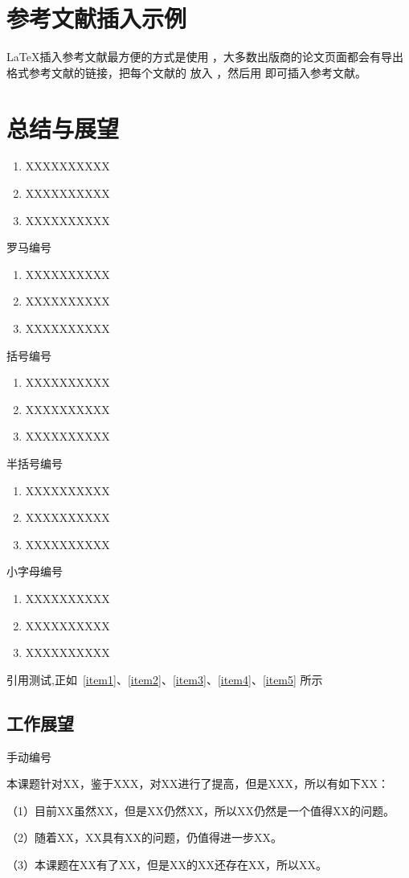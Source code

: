 
\section{参考文献插入示例}

\LaTeX \cite{lamport1994latex}插入参考文献最方便的方式是使用 \cite{pritchard1969statistical}，大多数出版商的论文页面都会有导出  格式参考文献的链接，把每个文献的  放入 ，然后用  即可插入参考文献。

\lipsum



\section{总结与展望}

\begin{enumerate}
 \item XXXXXXXXXX
 \label{item1}
 \item XXXXXXXXXX
 \item XXXXXXXXXX
\end{enumerate}
罗马编号
\begin{enumerate}[label=(\roman*)]
 \item XXXXXXXXXX
 \label{item2}
 \item XXXXXXXXXX
 \item XXXXXXXXXX
\end{enumerate}
括号编号
\begin{enumerate}[label=(\arabic*)]
 \item XXXXXXXXXX
 \label{item3}
 \item XXXXXXXXXX
 \item XXXXXXXXXX
\end{enumerate}
半括号编号
\begin{enumerate}[label=\arabic*)]
 \item XXXXXXXXXX
 \label{item4}
 \item XXXXXXXXXX
 \item XXXXXXXXXX
\end{enumerate}
小字母编号
\begin{enumerate}[label=\alph*)]
 \item XXXXXXXXXX
 \label{item5}
 \item XXXXXXXXXX
 \item XXXXXXXXXX
\end{enumerate}

引用测试,正如~\ref{item1}、\ref{item2}、\ref{item3}、\ref{item4}、\ref{item5} 所示

\subsection{工作展望}
手动编号 %

本课题针对XX，鉴于XXX，对XX进行了提高，但是XXX，所以有如下XX：

（1）目前XX虽然XX，但是XX仍然XX，所以XX仍然是一个值得XX的问题。

（2）随着XX，XX具有XX的问题，仍值得进一步XX。

（3）本课题在XX有了XX，但是XX的XX还存在XX，所以XX。


\newpage
